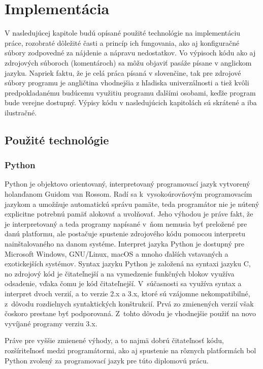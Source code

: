 \chapter{Implementácia}
V nasledujúcej kapitole budú opísané použité technológie na implementáciu práce, rozobraté dôležité časti a princíp ich fungovania, ako aj konfiguračné súbory zodpovedné za nájdenie a nápravu nedostatkov. Vo výpisoch kódu ako aj zdrojových súboroch (komentároch) sa môžu objaviť pasáže písane v anglickom jazyku. Napriek faktu, že je celá práca písaná v slovenčine, tak pre zdrojové súbory programu je angličtina vhodnejšia z hľadiska univerzálnosti a tiež kvôli predpokladanému budúcemu využitiu programu ďalšími osobami, keďže program bude verejne dostupný. Výpisy kódu v nasledujúcich kapitolách sú skrátené a iba ilustračné.

\section{Použité technológie}
 \subsection{Python}
 Python \cite{B4mfUgNUpPnXbiEr} je objektovo orientovaný, interpretovaný programovací jazyk vytvorený holanďanom Guidom van Rossom. Radí sa k~vysokoúrovňovým programovacím jazykom a umožňuje automatickú správu pamäte, teda programátor nie je nútený explicitne potrebnú pamäť alokovať a uvolňovať. Jeho výhodou je práve fakt, že je interpretovaný a teda programy napísané v~ňom nemusia byť preložené pre danú platformu, ale postačuje spustenie zdrojového kódu pomocou interpretu nainštalovaného na danom systéme. Interpret jazyka Python je dostupný pre Microsoft Windows, GNU/Linux, macOS a mnoho ďalších vstavaných a exotickejších systémov. Syntax jazyku Python je založená na syntaxi jazyku C, no zdrojový kód je čitateľnejší a na vymedzenie funkčných blokov využíva odsadenie, vďaka čomu je kód čitateľnejší. V~súčasnosti sa využíva syntax a interpret dvoch verzií, a to verzie 2.x a 3.x, ktoré sú vzájomne nekompatibilné, z~dôvodu rozdielnych syntaktických konštrukcií. Prvá zo zmienených verzií však čoskoro prestane byť podporovaná. Z~tohto dôvodu je vhodnejšie použiť na novo vyvíjané programy verziu 3.x. 
  
 Práve pre vyššie zmienené výhody, a to najmä dobrú čitateľnosť kódu, rozšíriteľnosť  medzi programátormi, ako aj spustenie na rôznych platformách bol Python zvolený za programovací jazyk pre túto diplomovú prácu.
